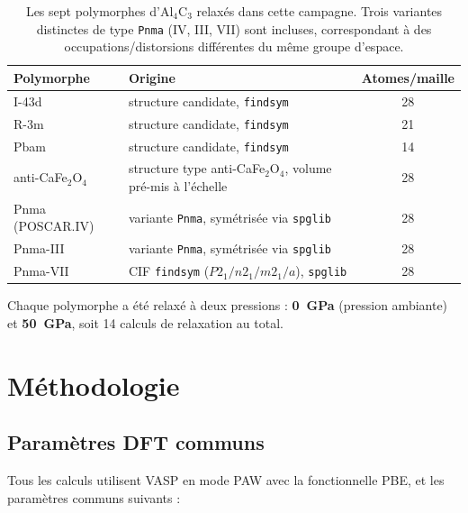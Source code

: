 \documentclass[11pt,a4paper]{article}
\begin{document}
\begin{table}[h]
\centering
\begin{tabular}{llc}
\toprule
Polymorphe & Origine & Atomes/maille \\
\midrule
I-43d            & structure candidate, \texttt{findsym}                         & 28 \\
R-3m             & structure candidate, \texttt{findsym}                         & 21 \\
Pbam             & structure candidate, \texttt{findsym}                         & 14 \\
anti-CaFe$_2$O$_4$ & structure type anti-CaFe$_2$O$_4$, volume pré-mis à l'échelle & 28 \\
Pnma (POSCAR.IV) & variante \texttt{Pnma}, symétrisée via \texttt{spglib}        & 28 \\
Pnma-III         & variante \texttt{Pnma}, symétrisée via \texttt{spglib}        & 28 \\
Pnma-VII         & CIF \texttt{findsym} ($P2_1/n2_1/m2_1/a$), \texttt{spglib}    & 28 \\
\bottomrule
\end{tabular}
\caption{Les sept polymorphes d'Al$_4$C$_3$ relaxés dans cette campagne. Trois variantes
distinctes de type \texttt{Pnma} (IV, III, VII) sont incluses, correspondant à des
occupations/distorsions différentes du même groupe d'espace.}
\end{table}

Chaque polymorphe a été relaxé à deux pressions : \textbf{0~GPa} (pression ambiante) et
\textbf{50~GPa}, soit 14 calculs de relaxation au total.

\section{Méthodologie}

\subsection{Paramètres DFT communs}

Tous les calculs utilisent VASP en mode PAW avec la fonctionnelle PBE, et les paramètres
communs suivants :
\end{document}
